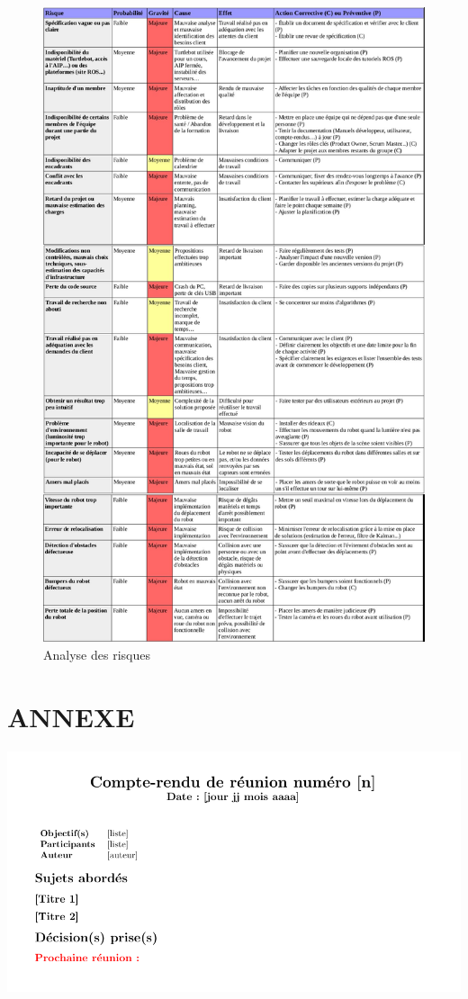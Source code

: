 \documentclass[10pt,a4paper]{article}
\begin{document}
\begin{figure}[!h]
  \centering
  \noindent\centerline{\includegraphics[scale=0.27]{Analyse_des_risques.jpg}}
  \caption{Analyse des risques}
\end{figure}

\newpage
\section*{ANNEXE}

\noindent\includegraphics[width=\textwidth]{tmp-cr.png} 
\end{document}

